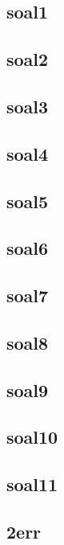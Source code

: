 \documentclass[a4paper,12pt]{report}
\begin{document}
\subsection*{soal1}

\subsection*{soal2}

\subsection*{soal3}

\subsection*{soal4}

\subsection*{soal5}

\subsection*{soal6}

\subsection*{soal7}

\subsection*{soal8}

\subsection*{soal9}

\subsection*{soal10}

\subsection*{soal11}

\subsection*{2err}

\end{document}
